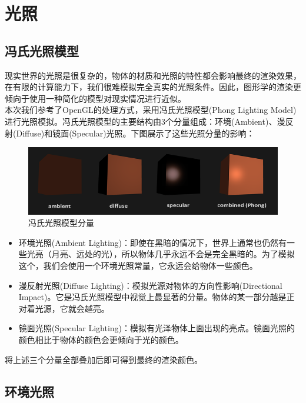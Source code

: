     \section{光照}
    \begin{spacing}{2.5}
    \subsection{冯氏光照模型}
    现实世界的光照是很复杂的，物体的材质和光照的特性都会影响最终的渲染效果，在有限的计算能力下，我们很难模拟完全真实的光照条件。因此，图形学的渲染更倾向于使用一种简化的模型对现实情况进行近似。\\
    本次我们参考了OpenGL的处理方式，采用冯氏光照模型(Phong Lighting Model)进行光照模拟。冯氏光照模型的主要结构由3个分量组成：环境(Ambient)、漫反射(Diffuse)和镜面(Specular)光照。下图展示了这些光照分量的影响：\\
    \begin{figure}[H]
    	\centering
		\includegraphics[width=1.0\textwidth]{images/phong_model.png}
		\caption{冯氏光照模型分量}
		\label{phong_model}
    \end{figure}
    
    \begin{itemize}
    	\item 环境光照(Ambient Lighting)：即使在黑暗的情况下，世界上通常也仍然有一些光亮（月亮、远处的光），所以物体几乎永远不会是完全黑暗的。为了模拟这个，我们会使用一个环境光照常量，它永远会给物体一些颜色。
    	\item 漫反射光照(Diffuse Lighting)：模拟光源对物体的方向性影响(Directional Impact)。它是冯氏光照模型中视觉上最显著的分量。物体的某一部分越是正对着光源，它就会越亮。
    	\item 镜面光照(Specular Lighting)：模拟有光泽物体上面出现的亮点。镜面光照的颜色相比于物体的颜色会更倾向于光的颜色。
    \end{itemize}
    
    将上述三个分量全部叠加后即可得到最终的渲染颜色。
    
    \subsection{环境光照}
    

\end{spacing}
